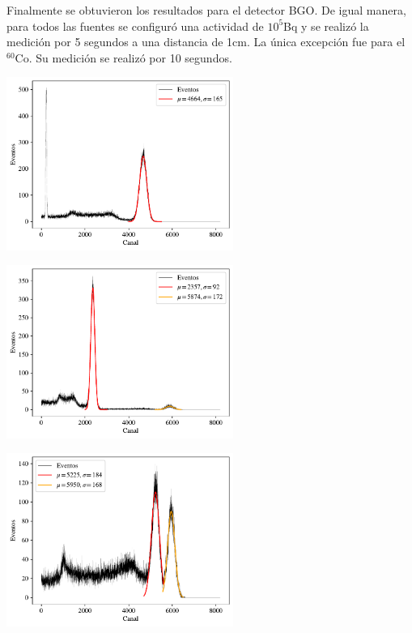 \documentclass[a4paper, onecolumn]{article}
\begin{document}
		Finalmente se obtuvieron los resultados para el detector BGO. De igual manera, para todos las fuentes se configuró una actividad de $10^5$Bq y se realizó la medición por 5 segundos a una distancia de 1cm. La única excepción fue para el ${}^{60}\mathrm{Co}$. Su medición se realizó por 10 segundos.

		\begin{center}
			\includegraphics[width=210pt]{img/nai_33_cs_137.pdf}
		\end{center}

		\begin{center}
			\includegraphics[width=210pt]{img/nai_33_na_22.pdf}
		\end{center}

		\begin{center}
			\includegraphics[width=210pt]{img/nai_33_co_60.pdf}
		\end{center}
\end{document}
